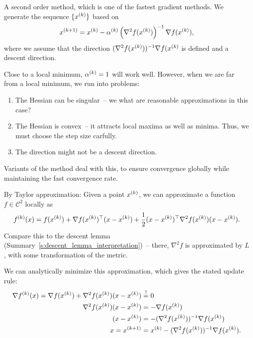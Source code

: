 \documentclass{article}
\begin{document}
A second order method, which is one of the fastest gradient methods.  We generate the sequence
\(\{\kth{x}\}\) based on
\begin{equation*}
  \kth[k+1]{x} = \kth{x} - \kth{\alpha}\left( \nabla^2 f(\kth{x}) \right)^{-1} \nabla f(\kth{x}),
\end{equation*}
where we assume that the direction \((\nabla^2 f(\kth{x}))^{-1} \nabla f(\kth{x}\) is
defined and a descent direction.

Close to a local minimum, \(\kth{\alpha} = 1\) will work well. However, when we are far from a local
minimum, we run into problems:
\begin{enumerate}
\item The Hessian can be singular~-- we what are reasonable approximations in this case?
\item The Hessian is convex~-- it attracts local maxima as well as minima.  Thus, we must choose the
  step size carfully.
\item The direction might not be a descent direction.
\end{enumerate}
Variants of the method deal with this, to ensure convergence globally while maintaining the fast
convergence rate.


\label{s:newton_method_derivation}

By Taylor approximation: Given a point \(\kth{x}\), we can approximate a function
\(f \in \mathcal{C}^2\) locally as
\begin{equation*}
  \kth{f}(x) = f(\kth{x}) + \T{\nabla f(\kth{x})}(x - \kth{x})
  + \frac{1}{2} \T{(x - \kth{x})} \nabla^2 f(\kth{x})(x - \kth{x}).
\end{equation*}
Compare this to the descent lemma (Summary~\ref{s:descent_lemma_interpretation})~-- there,
\(\nabla^2 f\) is approximated by \(L\), with some transformation of the metric.

We can analytically minimize this approximation, which gives the stated update rule:
\begin{align*}
  \nabla \kth{f}(x) = \nabla f(\kth{x}) + \nabla^2 f(\kth{x})(x - \kth{x}) &\overset{!}{=} 0 \\
  \nabla^2 f(\kth{x})(x - \kth{x}) &= -\nabla f(\kth{x}) \\
  (x - \kth{x}) &= -(\nabla^2 f(\kth{x}))^{-1} \nabla f(\kth{x}) \\
  x = \kth[k+1]{x} &= \kth{x} - (\nabla^2 f(\kth{x}))^{-1} \nabla f(\kth{x}).
\end{align*}
\end{document}
